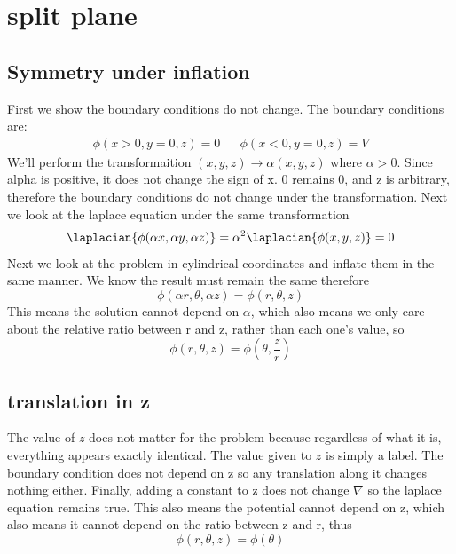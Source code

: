 \clearpage
\section{split plane}
\subsection{Symmetry under inflation}
First we show the boundary conditions do not change. The boundary conditions are:
\begin{align}
  \phi(x>0,y=0,z)=0 && \phi(x<0,y=0,z)=V
\end{align}
We'll perform the transformaition \((x,y,z) \rightarrow \alpha(x,y,z)\) where \(\alpha >0\). Since alpha is positive, it does not change the sign of x. 0 remains 0, and z is arbitrary, therefore the boundary conditions do not change under the transformation. Next we look at the laplace equation under the same transformation
\begin{align}
	\laplacian{\phi(\alpha x,\alpha y, \alpha z)}=\alpha^2\laplacian{\phi(x,y,z)}=0
\end{align}
Next we look at the problem in cylindrical coordinates and inflate them in the same manner. We know the result must remain the same therefore
\begin{equation}
  \phi(\alpha r,\theta,\alpha z) = \phi(r,\theta,z)
\end{equation}
This means the solution cannot depend on $\alpha$, which also means we only care about the relative ratio between r and z, rather than each one's value, so
\begin{equation}
  \phi(r,\theta,z)=\phi\left(\theta, \frac{z}{r}\right)
\end{equation}
\subsection{translation in z}
The value of \(z\) does not matter for the problem because regardless of what it is, everything appears exactly identical. The value given to \(z\) is simply a label. The boundary condition does not depend on z so any translation along it changes nothing either. Finally, adding a constant to z does not change \(\nabla\) so the laplace equation remains true. This also means the potential cannot depend on z, which also means it cannot depend on the ratio between z and r, thus
\begin{equation}
  \phi(r,\theta,z)=\phi(\theta)
\end{equation}
